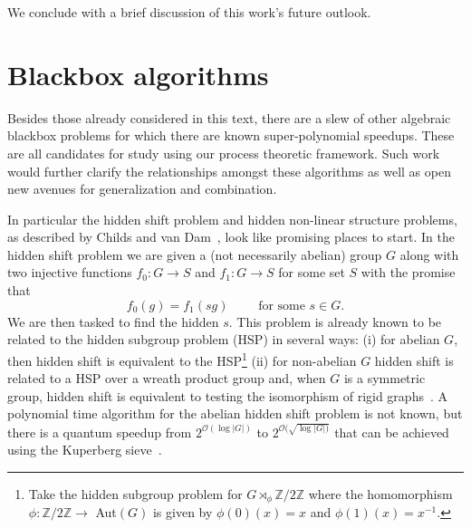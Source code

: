 We conclude with a brief discussion of this work's future outlook.

\section{Blackbox algorithms}

Besides those already considered in this text, there are a slew of other algebraic blackbox problems for which there are known super-polynomial speedups. These are all candidates for study using our process theoretic framework. Such work would further clarify the relationships amongst these algorithms as well as open new avenues for generalization and combination.

In particular the hidden shift problem and hidden non-linear structure problems, as described by Childs and van Dam~\cite{childs2010quantum}, look like promising places to start. In the hidden shift problem we are given a (not necessarily abelian) group $G$ along with two injective functions $f_0:G\to S$ and $f_1:G\to S$ for some set $S$ with the promise that
\begin{equation}
f_0(g) = f_1(sg) \qquad \mbox{ for some }s\in G.
\end{equation}
We are then tasked to find the hidden $s$. This problem is already known to be related to the hidden subgroup problem (HSP) in several ways: (i) for abelian $G$, then hidden shift is equivalent to the HSP\footnote{Take the hidden subgroup problem for $G\rtimes_{\phi}\mathbb{Z}/2\mathbb{Z}$ where the homomorphism $\phi:\mathbb{Z}/2\mathbb{Z}\to$ Aut$(G)$ is given by $\phi(0)(x)= x$ and $\phi(1)(x)=x^{-1}$.} (ii) for non-abelian $G$ hidden shift is related to a HSP over a wreath product group and, when $G$ is a symmetric group, hidden shift is equivalent to testing the isomorphism of rigid graphs~\cite{childs2010quantum}. A polynomial time algorithm for the abelian hidden shift problem is not known, but there is a quantum speedup from $2^{\mathcal{O}(\log |G|)}$ to $2^{\mathcal{O}(\sqrt{\log |G|)}}$ that can be achieved using the Kuperberg sieve~\cite{childs2010quantum,kuperberg2005subexponential}.

